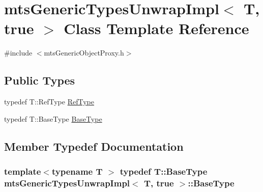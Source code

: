 \hypertarget{classmts_generic_types_unwrap_impl_3_01_t_00_01true_01_4}{}\section{mts\+Generic\+Types\+Unwrap\+Impl$<$ T, true $>$ Class Template Reference}
\label{classmts_generic_types_unwrap_impl_3_01_t_00_01true_01_4}


{\ttfamily \#include $<$mts\+Generic\+Object\+Proxy.\+h$>$}

\subsection*{Public Types}
\begin{DoxyCompactItemize}
\item 
typedef T\+::\+Ref\+Type \hyperlink{classmts_generic_types_unwrap_impl_3_01_t_00_01true_01_4_a9b39b8e29d3c298535f6ee83a35efcbf}{Ref\+Type}
\item 
typedef T\+::\+Base\+Type \hyperlink{classmts_generic_types_unwrap_impl_3_01_t_00_01true_01_4_aedbee707f9f89610f54c66939bb5ebe5}{Base\+Type}
\end{DoxyCompactItemize}


\subsection{Member Typedef Documentation}
\hypertarget{classmts_generic_types_unwrap_impl_3_01_t_00_01true_01_4_aedbee707f9f89610f54c66939bb5ebe5}{}
\subsubsection[{Base\+Type}]{\setlength{\rightskip}{0pt plus 5cm}template$<$typename T $>$ typedef T\+::\+Base\+Type {\bf mts\+Generic\+Types\+Unwrap\+Impl}$<$ T, true $>$\+::{\bf Base\+Type}}\label{classmts_generic_types_unwrap_impl_3_01_t_00_01true_01_4_aedbee707f9f89610f54c66939bb5ebe5}
\hypertarget{classmts_generic_types_unwrap_impl_3_01_t_00_01true_01_4_a9b39b8e29d3c298535f6ee83a35efcbf}{}
